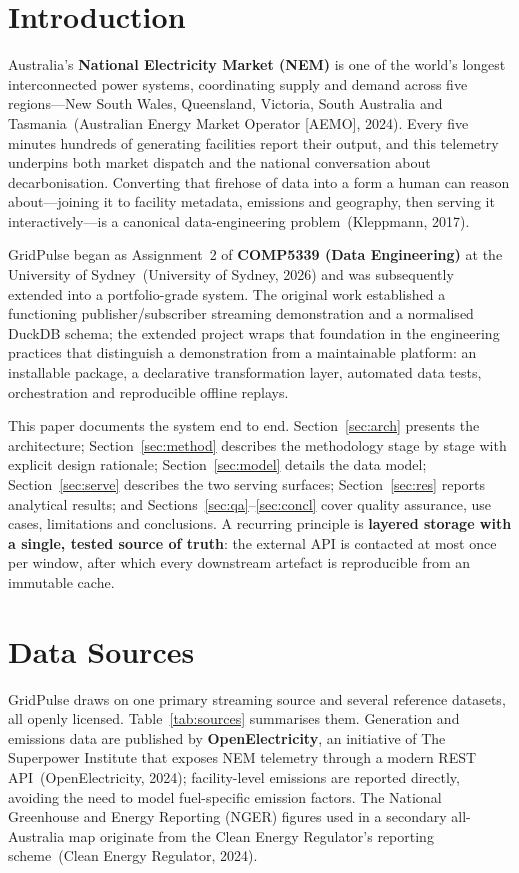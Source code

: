 \documentclass[onecolumn,11pt]{IEEEtran}
\begin{document}
\section{Introduction}
Australia's \textbf{National Electricity Market (NEM)} is one of the world's
longest interconnected power systems, coordinating supply and demand across five
regions---New South Wales, Queensland, Victoria, South Australia and
Tasmania~(Australian Energy Market Operator [AEMO], 2024). Every five minutes
hundreds of generating facilities report their output, and this telemetry
underpins both market dispatch and the national conversation about
decarbonisation. Converting that firehose of data into a form a human can reason
about---joining it to facility metadata, emissions and geography, then serving
it interactively---is a canonical data-engineering problem~(Kleppmann, 2017).

GridPulse began as Assignment~2 of \textbf{COMP5339 (Data Engineering)} at the
University of Sydney~(University of Sydney, 2026) and was subsequently extended
into a portfolio-grade system. The original work established a functioning
publisher/subscriber streaming demonstration and a normalised DuckDB schema; the
extended project wraps that foundation in the engineering practices that
distinguish a demonstration from a maintainable platform: an installable
package, a declarative transformation layer, automated data tests, orchestration
and reproducible offline replays.

This paper documents the system end to end. Section~\ref{sec:arch} presents the
architecture; Section~\ref{sec:method} describes the methodology stage by stage
with explicit design rationale; Section~\ref{sec:model} details the data model;
Section~\ref{sec:serve} describes the two serving surfaces; Section~\ref{sec:res}
reports analytical results; and Sections~\ref{sec:qa}--\ref{sec:concl} cover
quality assurance, use cases, limitations and conclusions. A recurring principle
is \textbf{layered storage with a single, tested source of truth}: the external
API is contacted at most once per window, after which every downstream artefact
is reproducible from an immutable cache.

\section{Data Sources}\label{sec:data}
GridPulse draws on one primary streaming source and several reference datasets,
all openly licensed. Table~\ref{tab:sources} summarises them. Generation and
emissions data are published by \textbf{OpenElectricity}, an initiative of The
Superpower Institute that exposes NEM telemetry through a modern REST
API~(OpenElectricity, 2024); facility-level emissions are reported directly,
avoiding the need to model fuel-specific emission factors. The National
Greenhouse and Energy Reporting (NGER) figures used in a secondary
all-Australia map originate from the Clean Energy Regulator's reporting
scheme~(Clean Energy Regulator, 2024).
\end{document}
